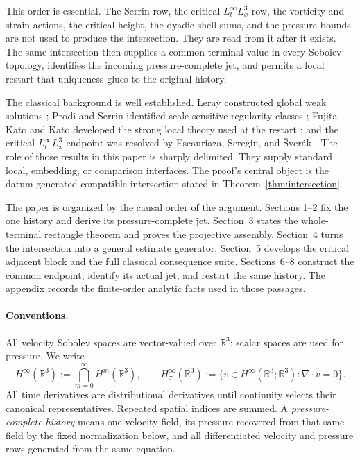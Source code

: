 \documentclass[11pt,letterpaper]{article}
\theoremstyle{definition}
\theoremstyle{remark}
\newcommand{\R}{\mathbb R}
\begin{document}
This order is essential.  The Serrin row, the critical
\(L_t^\infty L_x^3\) row, the vorticity and strain actions, the critical
height, the dyadic shell sums, and the pressure bounds are not used to
produce the intersection.  They are read from it after it exists.  The same
intersection then supplies a common terminal value in every Sobolev
topology, identifies the incoming pressure-complete jet, and permits a local
restart that uniqueness glues to the original history.

The classical background is well established.  Leray constructed global
weak solutions \cite{Leray1934}; Prodi and Serrin identified scale-sensitive
regularity classes \cite{Prodi1959,Serrin1962,Serrin1963}; Fujita--Kato and
Kato developed the strong local theory used at the restart
\cite{FujitaKato1964,Kato1984}; and the critical
\(L_t^\infty L_x^3\) endpoint was resolved by
Escauriaza, Seregin, and \v{S}ver\'ak
\cite{EscauriazaSereginSverak2003}.  The role of those results in this paper
is sharply delimited.  They supply standard local, embedding, or comparison
interfaces.  The proof's central object is the datum-generated compatible
intersection stated in Theorem~\ref{thm:intersection}.

The paper is organized by the causal order of the argument.  Sections
1--2 fix the one history and derive its pressure-complete jet.  Section~3
states the whole-terminal rectangle theorem and proves the projective
assembly.  Section~4 turns the intersection into a general estimate
generator.  Section~5 develops the critical adjacent block and the full
classical consequence suite.  Sections~6--8 construct the common endpoint,
identify its actual jet, and restart the same history.  The appendix records
the finite-order analytic facts used in those passages.

\paragraph{Conventions.}
All velocity Sobolev spaces are vector-valued over \(\R^3\); scalar spaces
are used for pressure.  We write
\[
H^\infty(\R^3):=\bigcap_{m=0}^{\infty}H^m(\R^3),
\qquad
H^\infty_\sigma(\R^3)
:=\{v\in H^\infty(\R^3;\R^3):\nabla\cdot v=0\}.
\]
All time derivatives are distributional derivatives until continuity
selects their canonical representatives.  Repeated spatial indices are
summed.  A \emph{pressure-complete history} means one velocity field,
its pressure recovered from that same field by the fixed normalization
below, and all differentiated velocity and pressure rows generated from the
same equation.
\end{document}
